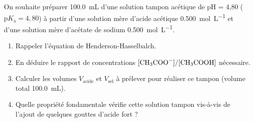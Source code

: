 \documentclass[11pt]{article}
\begin{document}
\begin{exercice}
On souhaite préparer \SI{100,0}{mL} d'une solution tampon acétique de pH = 4,80 ($\mathrm{p}K_\mathrm{a} = 4,80$) à partir d'une solution mère d'acide acétique \SI{0,500}{mol.L^{-1}} et d'une solution mère d'acétate de sodium \SI{0,500}{mol.L^{-1}}.
\begin{enumerate}
    \item Rappeler l'équation de Henderson-Hasselbalch.
    \item En déduire le rapport de concentrations $[\ce{CH3COO-}]/[\ce{CH3COOH}]$ nécessaire.
    \item Calculer les volumes $V_\mathrm{acide}$ et $V_\mathrm{sel}$ à prélever pour réaliser ce tampon (volume total \SI{100,0}{mL}).
    \item Quelle propriété fondamentale vérifie cette solution tampon vis-à-vis de l'ajout de quelques gouttes d'acide fort ?
\end{enumerate}
\end{exercice}
\end{document}
